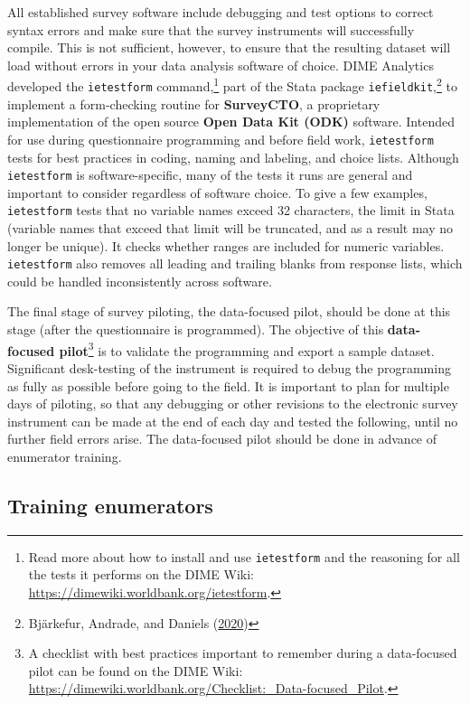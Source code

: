 \documentclass[
]{book}
\begin{document}
All established survey software include debugging and test options
to correct syntax errors and make sure that
the survey instruments will successfully compile.
This is not sufficient, however, to ensure that the resulting dataset
will load without errors in your data analysis software of choice.
DIME Analytics developed the \texttt{ietestform} command,\footnote{Read more about how to install and use \texttt{ietestform}
  and the reasoning for all the tests it performs on the DIME Wiki:
  \url{https://dimewiki.worldbank.org/ietestform}.}
part of the Stata package \texttt{iefieldkit},\footnote{Bjärkefur, Andrade, and Daniels (\protect\hyperlink{ref-bjarkefur2020iefieldkit}{2020})}
to implement a form-checking routine for \textbf{SurveyCTO},
a proprietary implementation of the open source \textbf{Open Data Kit (ODK)} software.
Intended for use during questionnaire programming and before field work,
\texttt{ietestform} tests for best practices
in coding, naming and labeling, and choice lists.
Although \texttt{ietestform} is software-specific,
many of the tests it runs are general and important to consider regardless of software choice.
To give a few examples, \texttt{ietestform} tests that no variable names exceed
32 characters, the limit in Stata (variable names that exceed that limit will
be truncated, and as a result may no longer be unique).
It checks whether ranges are included for numeric variables.
\texttt{ietestform} also removes all leading and trailing blanks from response lists,
which could be handled inconsistently across software.

The final stage of survey piloting, the data-focused pilot, should be done at this stage (after the questionnaire is programmed).
The objective of this \textbf{data-focused pilot}\footnote{A checklist with best practices important to remember during a data-focused pilot
  can be found on the DIME Wiki:
  \url{https://dimewiki.worldbank.org/Checklist:_Data-focused_Pilot}.}
is to validate the programming and export a sample dataset.
Significant desk-testing of the instrument is required to debug the programming
as fully as possible before going to the field.
It is important to plan for multiple days of piloting,
so that any debugging or other revisions to the electronic survey instrument
can be made at the end of each day and tested the following, until no further field errors arise.
The data-focused pilot should be done in advance of enumerator training.

\hypertarget{training-enumerators}{%
\subsection*{Training enumerators}\label{training-enumerators}}
\end{document}

